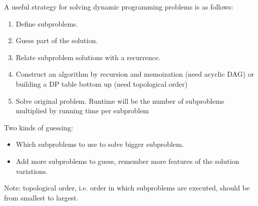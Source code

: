 \documentclass{article}
\begin{document}
    A useful strategy for solving dynamic programming problems is as follows:
    
    \begin{enumerate}
        \item Define subproblems.
        \item Guess part of the solution.
        \item Relate subproblem solutions with a recurrence.
        \item Construct an algorithm by recursion and memoization (need acyclic DAG) or building a DP table bottom up (need topological order)
        \item Solve original problem. Runtime  will be the number of subproblems multiplied by running time per subproblem
    \end{enumerate}
    
    Two kinds of guessing:
    \begin{itemize}
        \item Which subproblems to use to solve bigger subproblem.
        \item Add more subproblems to guess, remember more features of the solution variations.
    \end{itemize}
    
    Note: topological order, i.e. order in which subproblems are executed, should be from smallest to largest.
    
    
\end{document}
